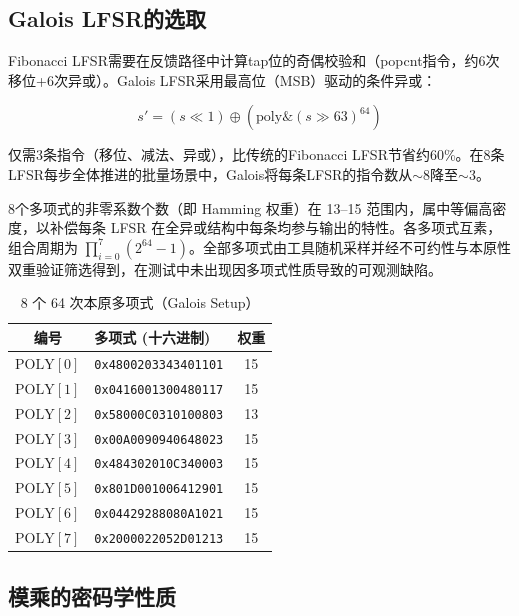 \documentclass[11pt,a4paper]{ctexart}
\begin{document}
\subsection{Galois LFSR的选取}

Fibonacci LFSR需要在反馈路径中计算tap位的奇偶校验和（popcnt指令，约6次移位+6次异或）。Galois LFSR采用最高位（MSB）驱动的条件异或：

\begin{equation}
s' = (s \ll 1) \oplus (\mathrm{poly} \mathbin{\&} (s \gg 63)^{64})
\end{equation}

仅需3条指令（移位、减法、异或），比传统的Fibonacci LFSR节省约60\%。在8条LFSR每步全体推进的批量场景中，Galois将每条LFSR的指令数从$\sim$8降至$\sim$3。

8个多项式的非零系数个数（即 Hamming 权重）在 13--15 范围内，属中等偏高密度，以补偿每条 LFSR 在全异或结构中每条均参与输出的特性。各多项式互素，组合周期为 $\prod_{i=0}^{7}(2^{64}-1)$。全部多项式由工具随机采样并经不可约性与本原性双重验证筛选得到，在测试中未出现因多项式性质导致的可观测缺陷。

\begin{table}[H]
\centering
\begin{tabular}{@{}clc@{}}
\toprule
\textbf{编号} & \textbf{多项式 (十六进制)} & \textbf{权重} \\
\midrule
$\mathrm{POLY}[0]$ & \texttt{0x4800203343401101} & 15 \\
$\mathrm{POLY}[1]$ & \texttt{0x0416001300480117} & 15 \\
$\mathrm{POLY}[2]$ & \texttt{0x58000C0310100803} & 13 \\
$\mathrm{POLY}[3]$ & \texttt{0x00A0090940648023} & 15 \\
$\mathrm{POLY}[4]$ & \texttt{0x484302010C340003} & 15 \\
$\mathrm{POLY}[5]$ & \texttt{0x801D001006412901} & 15 \\
$\mathrm{POLY}[6]$ & \texttt{0x04429288080A1021} & 15 \\
$\mathrm{POLY}[7]$ & \texttt{0x2000022052D01213} & 15 \\
\bottomrule
\end{tabular}
\caption{8 个 64 次本原多项式（Galois Setup）}
\label{tab:polys}
\end{table}

\subsection{模乘的密码学性质}
\end{document}
